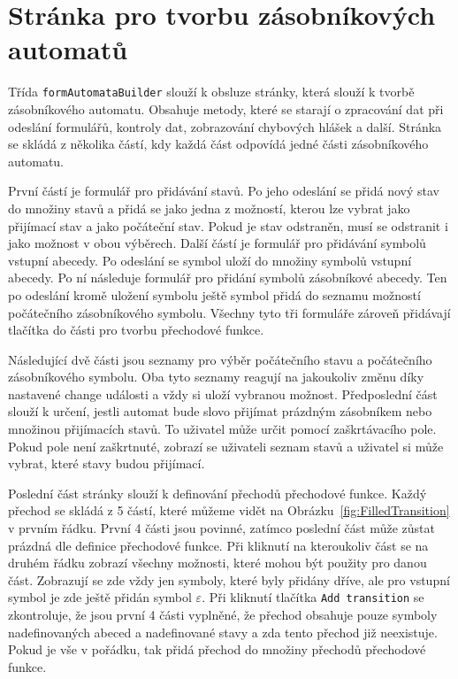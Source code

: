 \section{Stránka pro tvorbu zásobníkových automatů}\label{sec:PDABuilderImplementation}

Třída \texttt{formAutomataBuilder} slouží k obsluze stránky, která slouží k tvorbě zásobníkového automatu. Obsahuje metody, které se starají o zpracování dat při odeslání formulářů, kontroly dat, zobrazování chybových hlášek a další. Stránka se skládá z několika částí, kdy každá část odpovídá jedné části zásobníkového automatu. 

První částí je formulář pro přidávání stavů. Po jeho odeslání se přidá nový stav do množiny stavů a přidá se jako jedna z možností, kterou lze vybrat jako přijímací stav a jako počáteční stav. Pokud je stav odstraněn, musí se odstranit i jako možnost v obou výběrech. Další částí je formulář pro přidávání symbolů vstupní abecedy. Po odeslání se symbol uloží do množiny symbolů vstupní abecedy. Po ní následuje formulář pro přidání symbolů zásobníkové abecedy. Ten po odeslání kromě uložení symbolu ještě symbol přidá do seznamu možností počátečního zásobníkového symbolu. Všechny tyto tři formuláře zároveň přidávají tlačítka do části pro tvorbu přechodové funkce. 

Následující dvě části jsou seznamy pro výběr počátečního stavu a počátečního zásobníkového symbolu. Oba tyto seznamy reagují na jakoukoliv změnu díky nastavené change události a vždy si uloží vybranou možnost. Předposlední část slouží k určení, jestli automat bude slovo přijímat prázdným zásobníkem nebo množinou přijímacích stavů. To uživatel může určit pomocí zaškrtávacího pole. Pokud pole není zaškrtnuté, zobrazí se uživateli seznam stavů a uživatel si může vybrat, které stavy budou přijímací.

Poslední část stránky slouží k definování přechodů přechodové funkce. Každý přechod se skládá z 5 částí, které můžeme vidět na Obrázku~\ref{fig:FilledTransition} v prvním řádku. První 4 části jsou povinné, zatímco poslední část může zůstat prázdná dle definice přechodové funkce. Při kliknutí na kteroukoliv část se na druhém řádku zobrazí všechny možnosti, které mohou být použity pro danou část. Zobrazují se zde vždy jen symboly, které byly přidány dříve, ale pro vstupní symbol je zde ještě přidán symbol $\varepsilon$. Při kliknutí tlačítka \texttt{Add transition} se zkontroluje, že jsou první 4 části vyplněné, že přechod obsahuje pouze symboly nadefinovaných abeced a nadefinované stavy a zda tento přechod již neexistuje. Pokud je vše v pořádku, tak přidá přechod do množiny přechodů přechodové funkce.

